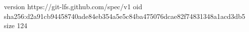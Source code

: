 version https://git-lfs.github.com/spec/v1
oid sha256:d2a91cb94458740ade84eb354a5e5c84ba475076dcae82f74831348a1acd3db5
size 124
